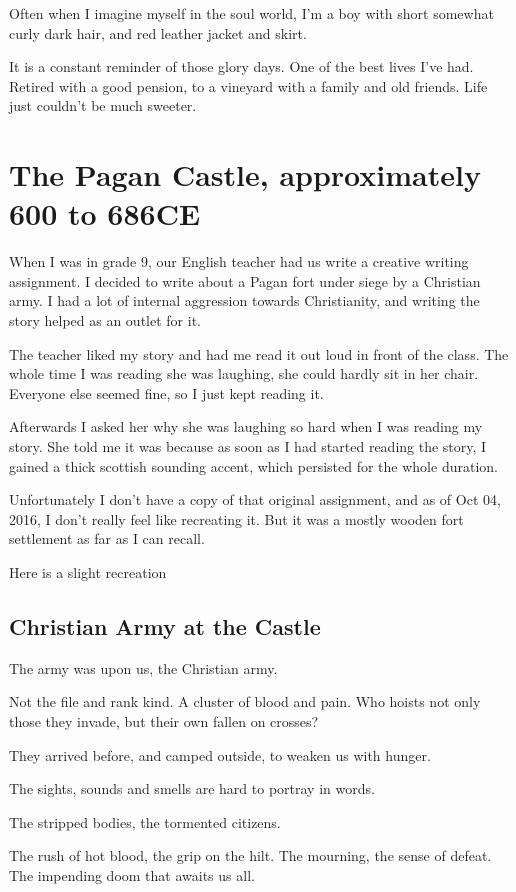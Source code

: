Often when I imagine myself in the soul world, I'm a boy with short somewhat
curly dark hair, and red leather jacket and skirt. 

It is a constant reminder of those glory days. 
One of the best lives I've had. Retired with a good pension, to a vineyard with
a family and old friends. Life just couldn't be much sweeter. 

\chapter{The Pagan Castle, approximately 600 to 686CE}
When I was in grade 9, our English teacher had us write a creative writing
assignment. I decided to write about a Pagan fort under siege by a Christian
army.  I had a lot of internal aggression towards Christianity, and writing the
story helped as an outlet for it. 

The teacher liked my story and had me read it out loud in front of the class.
The whole time I was reading she was laughing, she could hardly sit in her
chair. Everyone else seemed fine, so I just kept reading it. 

Afterwards I asked her why she was laughing so hard when I was reading my story. 
She told me it was because as soon as I had started reading the story, I gained
a thick scottish sounding accent, which persisted for the whole duration. 

Unfortunately I don't have a copy of that original assignment, and as of Oct
04, 2016, I don't really feel like recreating it. But it was a mostly wooden 
fort settlement as far as I can recall. 

Here is a slight recreation

\section{Christian Army at the Castle}
The army was upon us, the Christian army.

Not the file and rank kind. A cluster of blood and pain. 
Who hoists not only those they invade, but their own fallen on crosses?

They arrived before, and camped outside, to weaken us with hunger. 

The sights, sounds and smells are hard to portray in words. 

The stripped bodies, the tormented citizens. 

The rush of hot blood, the grip on the hilt. The mourning, the sense of defeat. 
The impending doom that awaits us all. 

